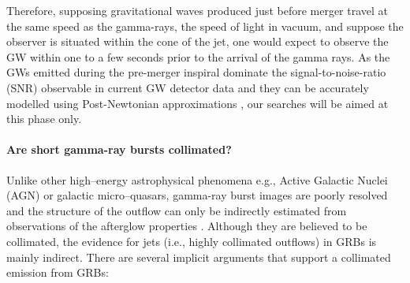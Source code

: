 Therefore, supposing gravitational waves produced just before merger travel at the same speed as the gamma-rays, the speed of light in vacuum, and suppose the observer is situated within the cone of the jet, one would expect to observe the GW within one to a few seconds prior to the arrival of the gamma rays. As the GWs emitted during the pre-merger inspiral dominate the signal-to-noise-ratio (SNR) observable in current GW detector data and they can be accurately modelled using Post-Newtonian approximations \cite{ABIQ04, AIQS06a}, our searches will be aimed at this phase only.

\paragraph{Are short gamma-ray bursts collimated?}
Unlike other high--energy astrophysical phenomena e.g., Active Galactic Nuclei (AGN) or galactic micro--quasars, gamma-ray burst images are poorly resolved and the structure of the outflow can only be indirectly estimated from observations of the afterglow properties \cite{Granot:2010iq}. Although they are believed to be collimated, the evidence for jets (i.e., highly collimated outflows) in GRBs is mainly indirect. There are several implicit arguments that support a collimated emission from GRBs: 

